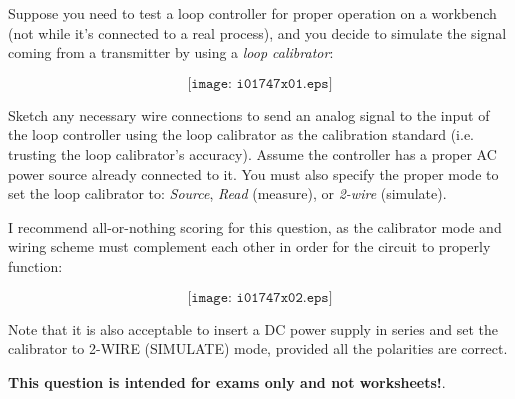 

Suppose you need to test a loop controller for proper operation on a workbench (not while it's connected to a real process), and you decide to simulate the signal coming from a transmitter by using a {\it loop calibrator}:

$$\texttt{[image: i01747x01.eps]}$$

Sketch any necessary wire connections to send an analog signal to the input of the loop controller using the loop calibrator as the calibration standard (i.e. trusting the loop calibrator's accuracy).  Assume the controller has a proper AC power source already connected to it.  You must also specify the proper mode to set the loop calibrator to: {\it Source}, {\it Read} (measure), or {\it 2-wire} (simulate).







I recommend all-or-nothing scoring for this question, as the calibrator mode and wiring scheme must complement each other in order for the circuit to properly function:

$$\texttt{[image: i01747x02.eps]}$$

Note that it is also acceptable to insert a DC power supply in series and set the calibrator to 2-WIRE (SIMULATE) mode, provided all the polarities are correct.







{\bf This question is intended for exams only and not worksheets!}.


